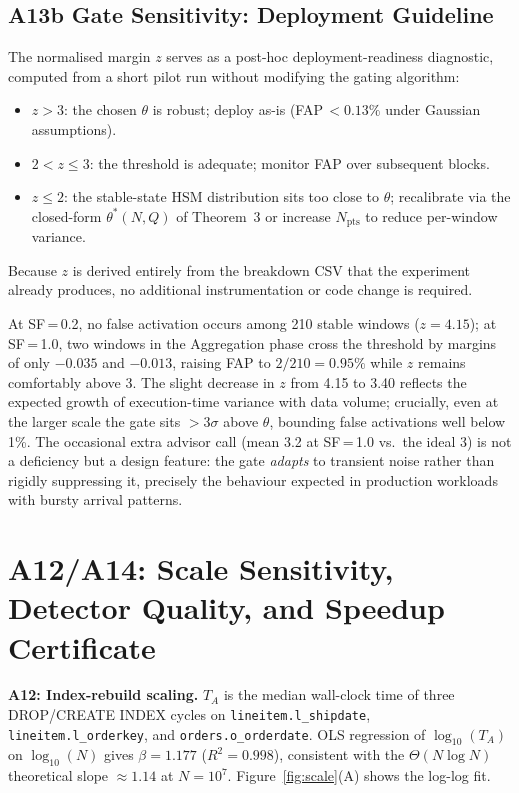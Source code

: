 \documentclass[10pt,twocolumn,a4paper]{article}
\newcommand{\Npts}{N_{\mathrm{pts}}}
\newcommand{\thetastar}{\theta^{*}}
\begin{document}
\subsection{A13b Gate Sensitivity: Deployment Guideline}

The normalised margin $z$ serves as a post-hoc deployment-readiness
diagnostic, computed from a short pilot run without modifying the
gating algorithm:

\begin{itemize}
\item $z>3$: the chosen $\theta$ is robust; deploy as-is
(FAP\,$<0.13\%$ under Gaussian assumptions).
\item $2<z\le3$: the threshold is adequate; monitor FAP over
subsequent blocks.
\item $z\le2$: the stable-state HSM distribution sits too close to
$\theta$; recalibrate via the closed-form
$\thetastar(N,Q)$ of Theorem~3 or increase
$\Npts$ to reduce per-window variance.
\end{itemize}

\noindent Because $z$ is derived entirely from the breakdown CSV that
the experiment already produces, no additional instrumentation
or code change is required.

At SF\,=\,0.2, no false activation occurs among 210 stable windows
($z\!=\!4.15$); at SF\,=\,1.0, two windows in the Aggregation phase
cross the threshold by margins of only $-0.035$ and $-0.013$, raising
FAP to $2/210\!=\!0.95\%$ while $z$ remains comfortably above 3.
The slight decrease in $z$ from 4.15 to 3.40 reflects the expected
growth of execution-time variance with data volume; crucially, even at
the larger scale the gate sits $>3\sigma$ above $\theta$, bounding
false activations well below 1\%.
The occasional extra advisor call (mean 3.2 at SF\,=\,1.0 vs.\
the ideal 3) is not a deficiency but a design feature: the gate
\emph{adapts} to transient noise rather than rigidly suppressing it,
precisely the behaviour expected in production workloads with bursty
arrival patterns.

\section{A12/A14: Scale Sensitivity, Detector Quality, and Speedup Certificate}\label{supp:a12a14}

\textbf{A12: Index-rebuild scaling.}
$T_A$ is the median wall-clock time of three DROP/CREATE INDEX cycles on
\texttt{lineitem.l\_shipdate}, \texttt{lineitem.l\_orderkey}, and
\texttt{orders.o\_orderdate}.
OLS regression of $\log_{10}(T_A)$ on $\log_{10}(N)$ gives
$\beta\!=\!1.177$ ($R^2\!=\!0.998$), consistent with the
$\Theta(N\log N)$ theoretical slope $\approx\!1.14$ at $N\!=\!10^{7}$.
Figure~\ref{fig:scale}(A) shows the log-log fit.
\end{document}
